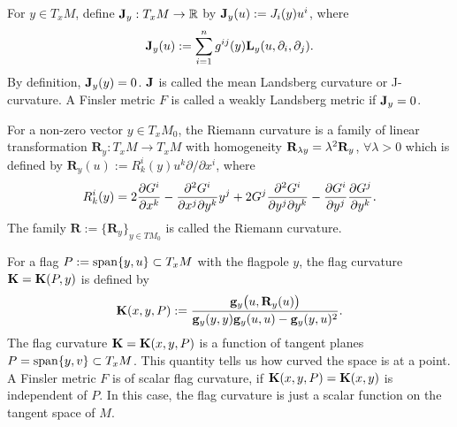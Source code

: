 \documentclass[12pt,a4paper]{article}
\theoremstyle{definition}
\newcommand{\be}{\begin{equation}}
\newcommand{\ee}{\end{equation}}
\numberwithin{equation}{section}
\begin{document}
For $y\in T_xM$, define ${\bf J}_y:T_xM\rightarrow \mathbb{R}$  by ${\bf J}_y(u):=J_i(y) u^i$, where
\[
{\bf J}_y(u):=\sum^n_{i=1}g^{ij}(y) {\bf L}_y(u, \partial_i, \partial_j).
\]
By definition,   ${\bf J}_y(y)=0$. $\bf J$ is called the mean Landsberg curvature or J-curvature.
A Finsler metric $F$ is called a weakly Landsberg  metric if ${\bf J}_y=0$.


\bigskip

For a non-zero vector $y \in T_xM_{0}$, the Riemann curvature is a family of linear
transformation $\textbf{R}_y: T_xM \rightarrow T_xM$ with homogeneity ${\bf R}_{\lambda y}=\lambda^2 {\bf R}_y$,
$\forall \lambda>0$ which is defined by
$\textbf{R}_y(u):=R^i_{k}(y)u^k {\partial/ {\partial x^i}}$, where
\be
R^i_{k}(y)=2{\partial G^i \over {\partial x^k}}-{\partial^2 G^i \over
{{\partial x^j}{\partial y^k}}}y^j+2G^j{\partial^2 G^i \over
{{\partial y^j}{\partial y^k}}}-{\partial G^i \over {\partial
y^j}}{\partial G^j \over {\partial y^k}}.\label{Riemannx}
\ee
The family $\textbf{R}:=\{\textbf{R}_y\}_{y\in TM_0}$ is called the Riemann curvature.
\bigskip

For a flag $P:={\rm span}\{y, u\} \subset T_xM$ with the flagpole $y$, the flag curvature ${\bf
K}={\bf K}(P, y)$ is defined by
\be
{\bf K}(x, y, P):= {{\bf g}_y \big(u, {\bf R}_y(u)\big) \over {\bf g}_y(y, y) {\bf g}_y(u,u)
-{\bf g}_y(y, u)^2 }.\label{K}
\ee
The flag curvature ${\bf K}={\bf K}(x, y, P)$ is a function of tangent planes $P={\rm span}\{ y, v\}\subset T_xM$. This quantity tells us how curved the space is at a point.   A Finsler metric $F$ is of scalar flag curvature, if ${\bf K}(x, y, P)={\bf K}(x, y)$ is independent of $ P$. In this case, the flag curvature is just a scalar function on the tangent space of $M$.



\end{document}
